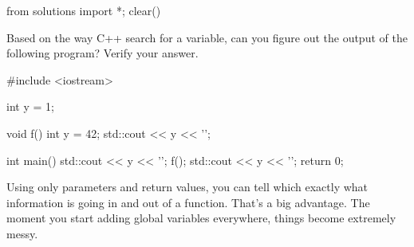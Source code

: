 \begin{python0}
from solutions import *; clear()
\end{python0}

Based on the way C++ search for a variable, can you figure out the output of the following program? Verify your answer.

\begin{consolethree}[escapeinside=||]
#include <iostream>

int y = 1;

void f()
{
    int y = 42;
    std::cout << y << '\n';
}

int main()
{
    std::cout << y << '\n';
    f();
    std::cout << y << '\n';
    return 0;
}
\end{consolethree}

Using only parameters and return values, you can tell which exactly what information is going in and out of a function. That's a big advantage. The moment you start adding global variables everywhere, things become extremely messy.



